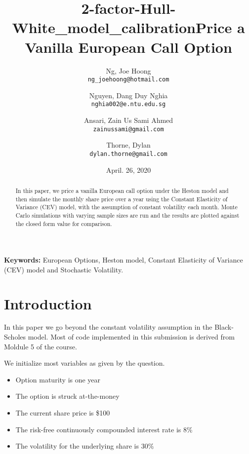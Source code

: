 \documentclass[11pt]{article}
\title{2-factor-Hull-White\_model\_calibration}
\begin{document}
\nocite{*} %

\title{Price a Vanilla European Call Option}

\author{
  Ng, Joe Hoong\\
  \texttt{ng\_joehoong@hotmail.com}
  \and
  Nguyen, Dang Duy Nghia \\
  \texttt{nghia002@e.ntu.edu.sg}
   \and
  Ansari, Zain Us Sami Ahmed \\
  \texttt{zainussami@gmail.com}  
   \and
   Thorne, Dylan \\
  \texttt{dylan.thorne@gmail.com}  
  }

\date{April. 26, 2020} %
\maketitle

\noindent
\textbf{Keywords:} European Options, Heston model,  Constant Elasticity of Variance (CEV) model and Stochastic Volatility.



\begin{abstract}
    In this paper, we price a vanilla European call option under the Heston model and then simulate the monthly share price over a year using the Constant Elasticity of Variance (CEV) model, with the assumption of constant volatility each month. Monte Carlo simulations with varying sample sizes are run and the results are plotted against the closed form value for comparison.
\end{abstract}

\section{Introduction
}

In this paper we go beyond the constant volatility assumption in the Black-Scholes model.  Most of code implemented in this submission is derived from Moldule 5 \cite{M5} of the course. 

We initialize most variables as given by the question. 

\begin{itemize}
    \item Option maturity is one year
    \item The option is struck at-the-money
    \item The current share price is \$100
    \item The risk-free continuously compounded interest rate is 8\%
    \item The volatility for the underlying share is 30\%
\end{itemize}
\end{document}
